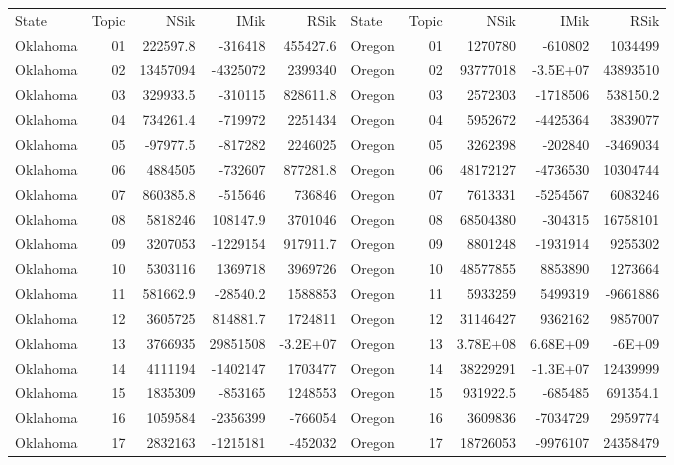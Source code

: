 \begin{table}[]
	\footnotesize
	\begin{tabular}{lrrrrlrrrr}
	State & Topic & NSik & IMik & RSik & State & Topic & NSik & IMik & RSik \\
		Oklahoma &  01  & 222597.8 & -316418 & 455427.6 & Oregon &  01  & 1270780 & -610802 & 1034499 \\
		Oklahoma &  02  & 13457094 & -4325072 & 2399340 & Oregon &  02  & 93777018 & -3.5E+07 & 43893510 \\
		Oklahoma &  03  & 329933.5 & -310115 & 828611.8 & Oregon &  03  & 2572303 & -1718506 & 538150.2 \\
		Oklahoma &  04  & 734261.4 & -719972 & 2251434 & Oregon &  04  & 5952672 & -4425364 & 3839077 \\
		Oklahoma &  05  & -97977.5 & -817282 & 2246025 & Oregon &  05  & 3262398 & -202840 & -3469034 \\
		Oklahoma &  06  & 4884505 & -732607 & 877281.8 & Oregon &  06  & 48172127 & -4736530 & 10304744 \\
		Oklahoma &  07  & 860385.8 & -515646 & 736846 & Oregon &  07  & 7613331 & -5254567 & 6083246 \\
		Oklahoma &  08  & 5818246 & 108147.9 & 3701046 & Oregon &  08  & 68504380 & -304315 & 16758101 \\
		Oklahoma &  09  & 3207053 & -1229154 & 917911.7 & Oregon &  09  & 8801248 & -1931914 & 9255302 \\
		Oklahoma &  10 & 5303116 & 1369718 & 3969726 & Oregon &  10 & 48577855 & 8853890 & 1273664 \\
		Oklahoma &  11 & 581662.9 & -28540.2 & 1588853 & Oregon &  11 & 5933259 & 5499319 & -9661886 \\
		Oklahoma &  12 & 3605725 & 814881.7 & 1724811 & Oregon &  12 & 31146427 & 9362162 & 9857007 \\
		Oklahoma &  13 & 3766935 & 29851508 & -3.2E+07 & Oregon &  13 & 3.78E+08 & 6.68E+09 & -6E+09 \\
		Oklahoma &  14 & 4111194 & -1402147 & 1703477 & Oregon &  14 & 38229291 & -1.3E+07 & 12439999 \\
		Oklahoma &  15 & 1835309 & -853165 & 1248553 & Oregon &  15 & 931922.5 & -685485 & 691354.1 \\
		Oklahoma &  16 & 1059584 & -2356399 & -766054 & Oregon &  16 & 3609836 & -7034729 & 2959774 \\
		Oklahoma &  17 & 2832163 & -1215181 & -452032 & Oregon &  17 & 18726053 & -9976107 & 24358479 \\

\end{tabular}
\end{table}
